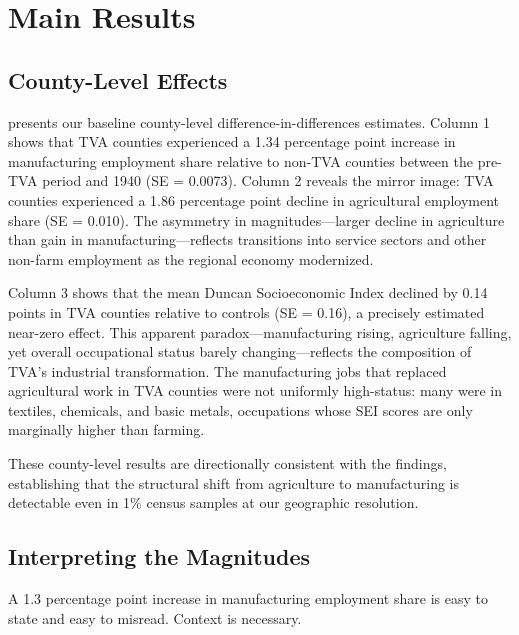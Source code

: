 \documentclass[12pt]{article}
\begin{document}
\section{Main Results}\label{sec:results}

\subsection{County-Level Effects}

 presents our baseline county-level difference-in-differences estimates. Column 1 shows that TVA counties experienced a 1.34 percentage point increase in manufacturing employment share relative to non-TVA counties between the pre-TVA period and 1940 (SE = 0.0073). Column 2 reveals the mirror image: TVA counties experienced a 1.86 percentage point decline in agricultural employment share (SE = 0.010). The asymmetry in magnitudes---larger decline in agriculture than gain in manufacturing---reflects transitions into service sectors and other non-farm employment as the regional economy modernized.

Column 3 shows that the mean Duncan Socioeconomic Index declined by 0.14 points in TVA counties relative to controls (SE = 0.16), a precisely estimated near-zero effect. This apparent paradox---manufacturing rising, agriculture falling, yet overall occupational status barely changing---reflects the composition of TVA's industrial transformation. The manufacturing jobs that replaced agricultural work in TVA counties were not uniformly high-status: many were in textiles, chemicals, and basic metals, occupations whose SEI scores are only marginally higher than farming.

These county-level results are directionally consistent with the \citet{kline2014} findings, establishing that the structural shift from agriculture to manufacturing is detectable even in 1\% census samples at our geographic resolution.

\subsection{Interpreting the Magnitudes}

A 1.3 percentage point increase in manufacturing employment share is easy to state and easy to misread. Context is necessary.
\end{document}
